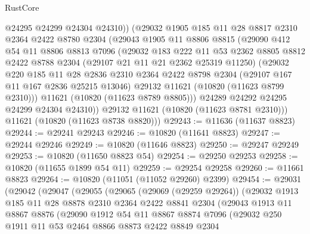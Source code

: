 \begin{lexlean}{RustCore}
\begin{coremodule}
          @24295
          @24299
          @24304
          @24310))
      (@29032
        @1905
        @185
        @11
        @28
        @8817
        @2310
        @2364
        @2422
        @8780
        @2304
        (@29043
          @1905
          @11
          @8806
          @8815
          (@29090
            @412
            @54
            @11
            @8806
            @8813
            @7096
            (@29032
              @183
              @222
              @11
              @53
              @2362
              @8805
              @8812
              @2422
              @8788
              @2304
              (@29107 @21 @11 @21 @2362 @25319 @11250)
              (@29032
                @220
                @185
                @11
                @28
                @2836
                @2310
                @2364
                @2422
                @8798
                @2304
                (@29107 @167 @11 @167 @2836 @25215 @13046)
                @29132
                @11621
                (@10820 (@11623 @8799 @2310)))
              @11621
              (@10820 (@11623 @8789 @8805)))
            @24289
            @24292
            @24295
            @24299
            @24304
            @24310))
        @29132
        @11621
        (@10820 (@11623 @8781 @2310)))
      @11621
      (@10820 (@11623 @8738 @8820)))
@29243 := @11636 (@11637 @8823)
@29244 := @29241 @29243
@29246 := @10820 (@11641 @8823)
@29247 := @29244 @29246
@29249 := @10820 (@11646 @8823)
@29250 := @29247 @29249
@29253 := @10820 (@11650 @8823 @54)
@29254 := @29250 @29253
@29258 := @10820 (@11655 @1899 @54 @11)
@29259 := @29254 @29258
@29260 := @11661 @8823
@29264 := @10820 (@11051 (@11052 @29260) @2399)
@29454 := @29031
    (@29042
      (@29047
        (@29055
          (@29065
            (@29069 (@29259 @29264))
            (@29032
              @1913
              @185
              @11
              @28
              @8878
              @2310
              @2364
              @2422
              @8841
              @2304
              (@29043
                @1913
                @11
                @8867
                @8876
                (@29090
                  @1912
                  @54
                  @11
                  @8867
                  @8874
                  @7096
                  (@29032
                    @250
                    @1911
                    @11
                    @53
                    @2464
                    @8866
                    @8873
                    @2422
                    @8849
                    @2304

\end{coremodule}
\end{lexlean}
